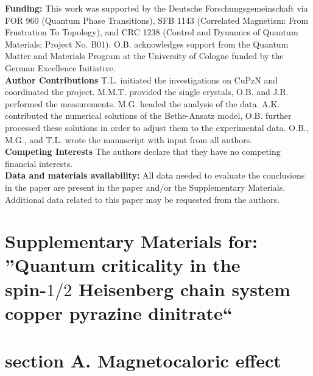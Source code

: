 \documentclass[12pt]{article}
\begin{document}
\noindent \textbf{Funding:} This work was supported by the Deutsche Forschungsgemeinschaft via FOR 960 (Quantum Phase Transitions), SFB 1143 (Correlated Magnetism: From Frustration To Topology), and CRC 1238 (Control and Dynamics of Quantum Materials; Project No. B01). O.B. acknowledges support from the Quantum Matter and Materials Program at the University of Cologne funded by the German Excellence Initiative.\\
\noindent \textbf{Author Contributions} T.L. initiated the investigations on CuPzN and coordinated the project. M.M.T. provided the single crystals, O.B. and J.R. performed the measurements. M.G. headed the analysis of the data. A.K. contributed the numerical solutions of the Bethe-Ansatz model, O.B. further processed these solutions in order to adjust them to the experimental data.  O.B., M.G., and T.L. wrote the manuscript with input from all authors.
\\
\noindent \textbf{Competing Interests} The authors declare that they have no competing financial interests.\\
\noindent \textbf{Data and materials availability:} All data needed to evaluate the conclusions in the paper are present in the paper and/or the Supplementary Materials. Additional data related to this paper may be requested from the authors.

\newpage

\section*{Supplementary Materials for: ''Quantum criticality in the \\ spin-$1/2$ Heisenberg chain system copper pyrazine dinitrate``}

\section*{section A. Magnetocaloric effect}
\end{document}

